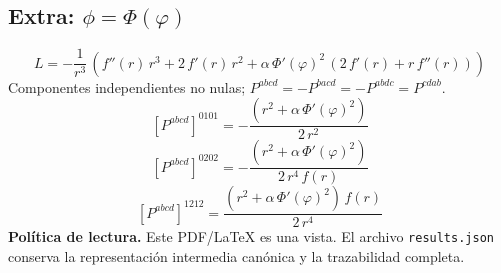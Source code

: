 \documentclass[11pt]{article}
\begin{document}
\subsection*{Extra: $\phi=\Phi\!\left(\varphi\right)$}
\begin{dmath*}[breakdepth={5}]
L=-\frac{1}{{r}^{3}}\,\left(f''\!\left(r\right)\,{r}^{3} + 2\,f'\!\left(r\right)\,{r}^{2} + \alpha\,{\Phi'\!\left(\varphi\right)}^{2}\,\left(2\,f'\!\left(r\right) + r\,f''\!\left(r\right)\right)\right)
\end{dmath*}
Componentes independientes no nulas; $P^{abcd}=-P^{bacd}=-P^{abdc}=P^{cdab}$.
\begin{dmath*}[breakdepth={5}]
\left[P^{abcd}\right]^{0101}=-\frac{\left({r}^{2} + \alpha\,{\Phi'\!\left(\varphi\right)}^{2}\right)}{2\,{r}^{2}}
\end{dmath*}
\begin{dmath*}[breakdepth={5}]
\left[P^{abcd}\right]^{0202}=-\frac{\left({r}^{2} + \alpha\,{\Phi'\!\left(\varphi\right)}^{2}\right)}{2\,{r}^{4}\,f\!\left(r\right)}
\end{dmath*}
\begin{dmath*}[breakdepth={5}]
\left[P^{abcd}\right]^{1212}=\frac{\left({r}^{2} + \alpha\,{\Phi'\!\left(\varphi\right)}^{2}\right)\,f\!\left(r\right)}{2\,{r}^{4}}
\end{dmath*}
\bigskip\noindent\textbf{Política de lectura.} Este PDF/LaTeX es una vista. El archivo \texttt{results.json} conserva la representación intermedia canónica y la trazabilidad completa.
\end{document}
